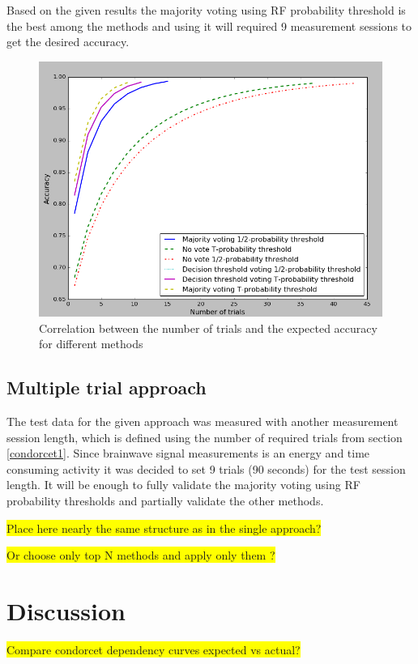 \documentclass[12pt]{article}
\begin{document}
Based on the given results the majority voting using RF probability threshold is the best among the methods and using it will required 9 measurement sessions to get the desired accuracy.

\begin{figure} [H]
\begin{center}
\includegraphics[width=1\textwidth]{condorcet_dependency_training}
\caption{Correlation between the number of trials and the expected accuracy for different methods}
\label{fig:fnCompModel}
\end{center}
\end{figure}

\subsection{Multiple trial approach}

The test data for the given approach was measured with another measurement session length, which is defined using the number of required trials from section \ref{condorcet1}. Since brainwave signal measurements is an energy and time consuming activity it was decided to set 9 trials (90 seconds) for the test session length. It will be enough to fully validate the majority voting using RF probability thresholds and partially validate the other methods.

\colorbox{yellow}{Place here nearly the same structure as in the single approach?}

\colorbox{yellow}{Or choose only top N methods and apply only them ?}

\newpage
\section{Discussion}
\colorbox{yellow}{Compare condorcet dependency curves expected vs actual?}
\end{document}
